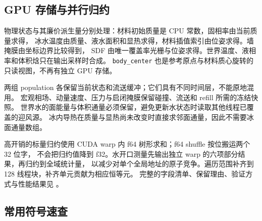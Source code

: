 \documentclass[UTF8,zihao=-4]{ctexart}
\newcommand{\code}[1]{\texttt{#1}}
\numberwithin{equation}{section}
\begin{document}
\subsection{GPU 存储与并行归约}

物理状态与其廉价派生量分别处理：材料初始质量是 CPU 常数，固相率由当前质量求得，
冰水温度由质量、液水面积和显热求得，材料插值索引由位姿求得。墙掩膜由坐标边界比较得到，
SDF 由唯一覆盖率光栅与位姿求得。世界温度、液相率和体积焓只在输出采样时合成。
\code{body\_center} 也是参考原点与材料质心旋转的只读视图，不再有独立 GPU 存储。

两组 population 各保留当前状态和流送缓冲；它们具有不同时间层，不能原地混用。
宏观相场、动量速度、压力与启闭掩膜保留碰撞、流送和 refill 所需的冻结快照。
世界水的面能量与体积通量必须保留，避免更新水状态时读取其他线程已覆盖的迎风源。
冰内导热在质量与显热尚未改变时直接求邻面通量，因此不需要冰面通量数组。

高开销的标量归约使用 CUDA warp 内 f64 树形求和；f64 shuffle 按位搬运两个 32 位字，
不会把归约值降到 f32。水开口测量先输出独立 warp 的六项部分结果，再归约到全域统计量，
以减少对单个全局地址的原子竞争。遍历范围补齐到 128 线程块，补齐单元贡献为相应恒等元。
完整的字段清单、保留理由、验证方式与性能结果见 。

\subsection{常用符号速查}
\end{document}

